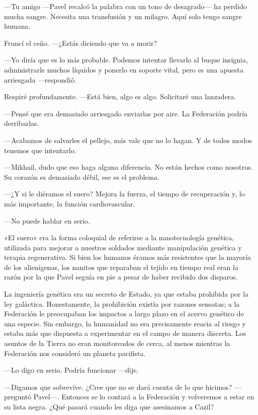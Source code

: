 —Tu amigo —Pavel recalcó la palabra con un tono de desagrado— ha perdido mucha sangre. Necesita una transfusión y un milagro. Aquí solo tengo sangre humana.

Fruncí el ceño. —¿Estás diciendo que va a morir?

—Yo diría que es lo más probable. Podemos intentar llevarlo al buque insignia, administrarle muchos líquidos y ponerlo en soporte vital, pero es una apuesta arriesgada —respondió.

Respiré profundamente. —Está bien, algo es algo. Solicitaré una lanzadera.

—Pensé que era demasiado arriesgado enviarlas por aire. La Federación podría derribarlas.

—Acabamos de salvarles el pellejo, más vale que no lo hagan. Y de todos modos tenemos que intentarlo.

—Mikhail, dudo que eso haga alguna diferencia. No están hechos como nosotros. Su corazón es demasiado débil, ese es el problema.

 —¿Y si le diéramos el suero? Mejora la fuerza, el tiempo de recuperación y, lo más importante, la función cardiovascular.

—No puede hablar en serio.

«El suero» era la forma coloquial de referirse a la nanotecnología genética, utilizada para mejorar a nuestros soldados mediante manipulación genética y terapia regenerativa. Si bien los humanos éramos más resistentes que la mayoría de los alienígenas, los nanitos que reparaban el tejido en tiempo real eran la razón por la que Pavel seguía en pie a pesar de haber recibido dos disparos.

La ingeniería genética era un secreto de Estado, ya que estaba prohibida por la ley galáctica. Honestamente, la prohibición existía por razones sensatas; a la Federación le preocupaban los impactos a largo plazo en el acervo genético de una especie. Sin embargo, la humanidad no era precisamente reacia al riesgo y estaba más que dispuesta a experimentar en el campo de manera discreta. Los asuntos de la Tierra no eran monitoreados de cerca, al menos mientras la Federación nos consideró un planeta pacifista.

—Lo digo en serio. Podría funcionar —dije.

—Digamos que sobrevive. ¿Cree que no se dará cuenta de lo que hicimos? —preguntó Pavel—. Entonces se lo contará a la Federación y volveremos a estar en su lista negra. ¿Qué pasará cuando les diga que asesinamos a Cazil?

